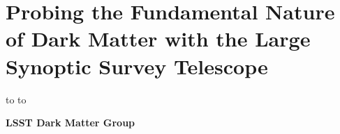 \documentclass[titlepage,oneside]{tcibook}
\begin{document}
\raggedbottom


\parindent=0pt
\parskip=8pt
\setlength{\evensidemargin}{0pt}
\setlength{\oddsidemargin}{0pt}
\setlength{\marginparsep}{0.0in}
\setlength{\marginparwidth}{0.0in}
\marginparpush=0pt


\renewcommand{\chapname}{chap:intro_}
\renewcommand{\chapterdir}{.}
\renewcommand{\arraystretch}{1.25}
\addtolength{\arraycolsep}{-3pt}

\chapter*{Probing the Fundamental Nature of Dark Matter with the Large Synoptic Survey Telescope}
\vskip -9.5pt
\hbox to
\vskip-6.5pt
\hbox to


\begin{center}
  {\Large\bf
    LSST Dark Matter Group\\
    \bigskip
    \date{}
  }
\end{center}
\eject

\setcounter{page}{1}



\clearpage


\tableofcontents 

\eject
{} 
\setcounter{page}{1}






\end{document}
